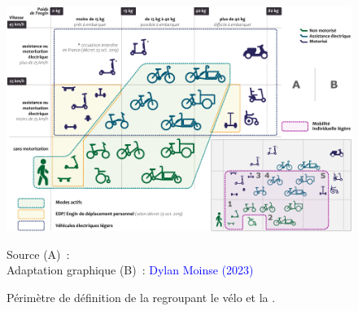 \begin{refsegment}
    \begin{figure}[h!]\vspace*{4pt}
        \caption{Périmètre de définition de la  regroupant le vélo et la .}
        \label{fig-chap1:perimetre-micromobilite}
        \centerline{\includegraphics[width=1\columnwidth]{src/Figures/Chap-1/FR_Definition_perimetre_micromobilite.pdf}}
        \vspace{5pt}
        \begin{flushright}\scriptsize{
        Source (A)~: \textcolor{blue}{\textcite[61]{rabaud_quand_2022}}
        \\
        Adaptation graphique (B)~: \textcolor{blue}{Dylan Moinse (2023)}
        }\end{flushright}
    \end{figure}


\end{refsegment}
